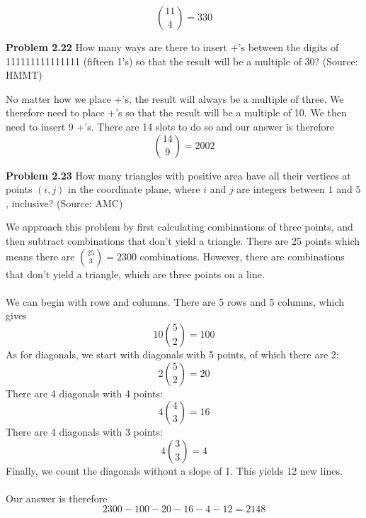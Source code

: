 \documentclass[11pt]{scrartcl}
\begin{document}
$${11 \choose 4}=330$$
\begin{tcolorbox}
\textbf{Problem 2.22} How many ways are there to insert +’s between the digits of 111111111111111 (fifteen 1’s) so that the
result will be a multiple of 30? (Source: HMMT)
\end{tcolorbox}
\noindent 
No matter how we place +'s, the result will always be a multiple of three. We therefore need to place +'s so that the result will be a multiple of 10. We then need to insert 9 +'s. There are 14 slots to do so and our answer is therefore
$${14 \choose 9}=2002$$
\begin{tcolorbox}
\textbf{Problem 2.23} How many triangles with positive area have all their vertices at points $(i,j)$ in the coordinate plane, where $i$ and $j$ are integers between $1$ and $5$, inclusive? (Source: AMC)
\end{tcolorbox}
\noindent 
We approach this problem by first calculating combinations of three points, and then subtract combinations that don't yield a triangle. There are 25 points which means there are ${25 \choose 3}=2300$ combinations. However, there are combinations that don't yield a triangle, which are three points on a line. \\
\\
\noindent 
We can begin with rows and columns. There are 5 rows and 5 columns, which gives $$10{5 \choose 2}=100$$
As for diagonals, we start with diagonals with 5 points, of which there are 2: $$2{5 \choose 2}=20$$
There are 4 diagonals with 4 points: $$4{4 \choose 3}=16$$
There are 4 diagonals with 3 points: $$4{3 \choose 3}=4$$
Finally, we count the diagonals without a slope of 1. This yields 12 new lines. \\
\\
\noindent 
Our answer is therefore 
$$2300-100-20-16-4-12=2148$$
\end{document}
